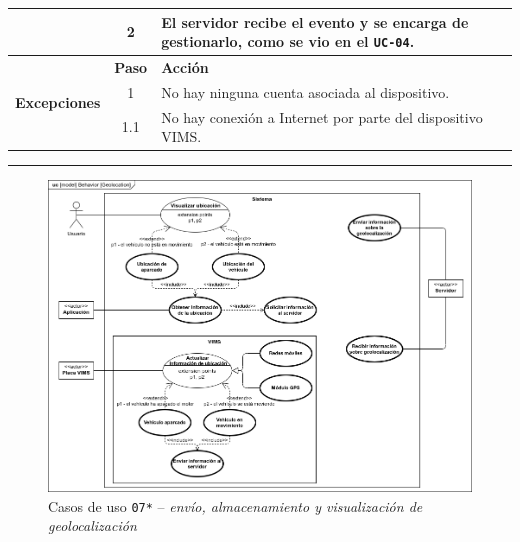 \begin{table}[H]
\begin{tabularx}{\textwidth}{|c|c|X|}
    \cline{2-3}
                                               & 2                                                                                                                                                 & \multicolumn{1}{L|}{El servidor recibe el evento y se encarga de gestionarlo, como se vio en el \texttt{UC-04}.} \\
    \hline
    \multirow{3}{*}{\textbf{Excepciones}}     & \textbf{Paso}                                                                                                                                     & \textbf{Acción}                                                                                                                                                         \\
    \cline{2-3}
                                               & 1                                                                                                                                               & \multicolumn{1}{L|}{No hay ninguna cuenta asociada al dispositivo.}                                                                                                                    \\
    \cline{2-3}
                                               & 1.1                                                                                                                                               & \multicolumn{1}{L|}{No hay conexión a Internet por parte del dispositivo \ac{VIMS}.}                                                                                    \\
    \hline
  \end{tabularx}
\end{table}

\noindent\rule{\linewidth}{.2pt}

\begin{figure}[H]
  \centering
  \includegraphics[width=\linewidth]{diagrams/UseCases-UC7 - location.png}
  \caption{Casos de uso \texttt{07*} -- \textit{envío, almacenamiento y visualización de geolocalización}}
  \label{uc:location}
\end{figure}

